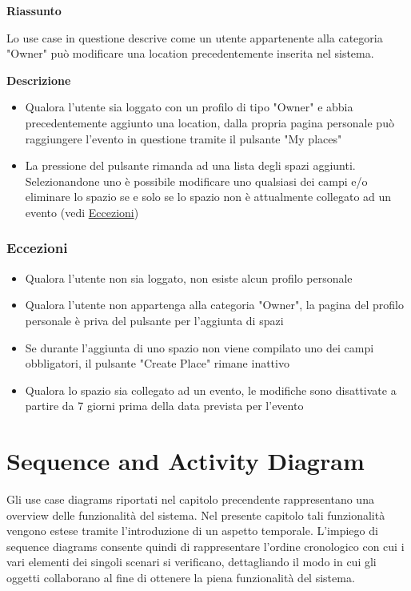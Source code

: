 \documentclass[9pt]{extarticle}
\begin{document}
\textbf{Riassunto}

Lo use case in questione descrive come un utente appartenente alla categoria "Owner" può modificare una location precedentemente inserita nel sistema.

\textbf{Descrizione}

\begin{itemize}
	\item Qualora l'utente sia loggato con un profilo di tipo "Owner" e abbia precedentemente aggiunto una location, dalla propria pagina personale può raggiungere l'evento in questione tramite il pulsante "My places"
	\item La pressione del pulsante rimanda ad una lista degli spazi aggiunti. Selezionandone uno è possibile modificare uno qualsiasi dei campi e/o eliminare lo spazio se e solo se lo spazio non è attualmente collegato ad un evento (vedi \hyperref[Eccezioni-FR12-13]{Eccezioni})
\end{itemize}

\subsubsection*{Eccezioni}\label{Eccezioni-FR12-13}
\begin{itemize}
	\item Qualora l'utente non sia loggato, non esiste alcun profilo personale
	\item Qualora l'utente non appartenga alla categoria "Owner", la pagina del profilo personale è priva del pulsante per l'aggiunta di spazi
	\item Se durante l'aggiunta di uno spazio non viene compilato uno dei campi obbligatori, il pulsante "Create Place" rimane inattivo
	\item Qualora lo spazio sia collegato ad un evento, le modifiche sono disattivate a partire da 7 giorni prima della data prevista per l'evento
\end{itemize}

\newpage
\section{Sequence and Activity Diagram}

Gli use case diagrams riportati nel capitolo precendente rappresentano una overview delle funzionalità del sistema. Nel presente capitolo tali funzionalità vengono estese tramite l'introduzione di un aspetto temporale. L'impiego di sequence diagrams consente quindi di rappresentare l'ordine cronologico con cui i vari elementi dei singoli scenari si verificano, dettagliando il modo in cui gli oggetti collaborano al fine di ottenere la piena funzionalità del sistema.
\end{document}
